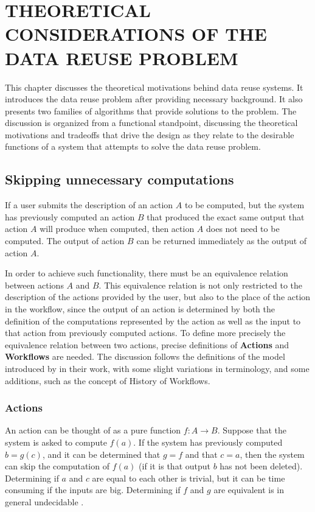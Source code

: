 \chapter{THEORETICAL CONSIDERATIONS OF THE DATA REUSE PROBLEM}
\label{chap:foundational}
This chapter discusses the theoretical motivations behind data reuse systems.  It introduces the data reuse problem after providing necessary background. It also presents two families of algorithms that provide solutions to the problem. The discussion is organized from a functional standpoint, discussing the theoretical motivations and tradeoffs that drive the design as they relate to the desirable functions of a system that attempts to solve the data reuse problem.

\section{Skipping unnecessary computations}
If a user submits the description of an action $A$ to be computed, but the system has previously computed an action $B$ that produced the exact same output that action $A$ will produce when computed, then action $A$ does not need to be computed.  The output of action $B$ can be returned immediately as the output of action $A$.  

In order to achieve such functionality, there must be an equivalence relation between actions $A$ and $B$. This equivalence relation is not only restricted to the description of the actions provided by the user, but also to the place of the action in the workflow, since the output of an action is determined by both the definition of the computations represented by the action as well as the input to that action from previously computed actions. To define more precisely the equivalence relation between two actions, precise definitions of \textbf{Actions} and \textbf{Workflows} are needed. The discussion follows the definitions of the model introduced by \cite{zohrevandi2013bounded} in their work, with some slight variations in terminology, and some additions, such as the concept of History of Workflows.

\subsection{Actions}
An action can be thought of as a pure function $f:A \rightarrow B$.  Suppose that the system is asked to compute $f(a)$.  If the system has previously computed $b=g(c)$, and it can be determined that $g=f$ and that $c=a$, then the system can skip the computation of $f(a)$ (if it is that output $b$ has not been deleted).  Determining if $a$ and $c$ are equal to each other is trivial, but it can be time consuming if the inputs are big.  Determining if $f$ and $g$ are equivalent is in general undecidable \citep{turing1937computable}.

